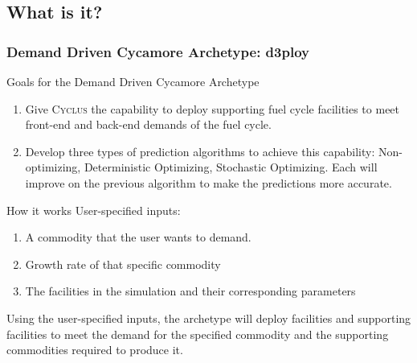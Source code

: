 \newcommand{\Cyclus}{\textsc{Cyclus}\xspace}%
\subsection{What is it?}
\begin{frame}
  \frametitle{Demand Driven Cycamore Archetype: d3ploy}

\begin{block}{Goals for the Demand Driven Cycamore Archetype}
\begin{enumerate}
	\item Give \Cyclus the capability to deploy supporting fuel cycle facilities to meet front-end and back-end demands of the fuel cycle. 
	\item Develop three types of prediction algorithms to achieve this capability: Non-optimizing, Deterministic Optimizing, Stochastic Optimizing. Each will improve on the previous algorithm to make the predictions more accurate. 
\end{enumerate}
\end{block}

\begin{block}{How it works}
User-specified inputs: 
\begin{enumerate}
	\item A commodity that the user wants to demand. 
	\item Growth rate of that specific commodity 
	\item The facilities in the simulation and their corresponding parameters
\end{enumerate}
Using the user-specified inputs, the archetype will deploy facilities and supporting facilities to meet the demand for the specified commodity and the supporting commodities required to produce it. 
\end{block}

\end{frame}

